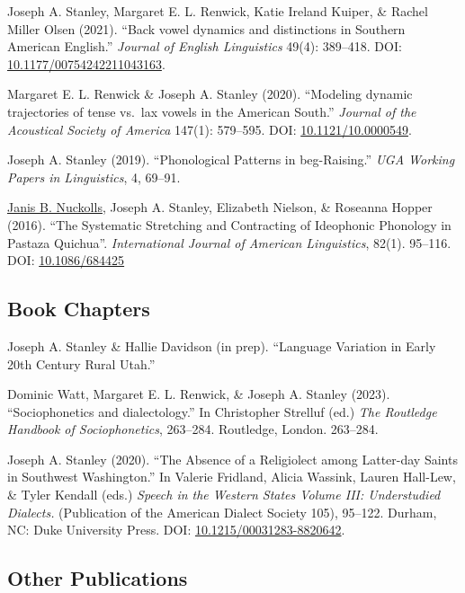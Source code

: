 \documentclass[
]{article}
\begin{document}
{Joseph A. Stanley}, Margaret E. L. Renwick, Katie Ireland Kuiper, \&
Rachel Miller Olsen (2021). ``Back vowel dynamics and distinctions in
Southern American English.'' \emph{Journal of English Linguistics}
49(4): 389--418. DOI:
\href{https://doi.org/10.1177/00754242211043163}{10.1177/00754242211043163}.

Margaret E. L. Renwick \& {Joseph A. Stanley} (2020). ``Modeling dynamic
trajectories of tense vs.~lax vowels in the American South.''
\emph{Journal of the Acoustical Society of America} 147(1): 579--595.
DOI:
\href{https://asa.scitation.org/doi/10.1121/10.0000549}{10.1121/10.0000549}.

{Joseph A. Stanley} (2019). ``Phonological Patterns in beg-Raising.''
\emph{UGA Working Papers in Linguistics}, 4, 69--91.

\href{https://hum.byu.edu/directory/janis-nuckolls}{Janis B. Nuckolls},
{Joseph A. Stanley}, Elizabeth Nielson, \& Roseanna Hopper (2016). ``The
Systematic Stretching and Contracting of Ideophonic Phonology in Pastaza
Quichua''. \emph{International Journal of American Linguistics}, 82(1).
95--116. DOI: \href{http://dx.doi.org/10.1086/684425}{10.1086/684425}

\hypertarget{book-chapters}{%
\subsection{Book Chapters}\label{book-chapters}}

{Joseph A. Stanley} \& Hallie Davidson (in prep). ``Language Variation
in Early 20th Century Rural Utah.''

Dominic Watt, Margaret E. L. Renwick, \& {Joseph A. Stanley} (2023).
``Sociophonetics and dialectology.'' In Christopher Strelluf (ed.)
\emph{The Routledge Handbook of Sociophonetics}, 263--284. Routledge,
London. 263--284.

{Joseph A. Stanley} (2020). ``The Absence of a Religiolect among
Latter-day Saints in Southwest Washington.'' In Valerie Fridland, Alicia
Wassink, Lauren Hall-Lew, \& Tyler Kendall (eds.) \emph{Speech in the
Western States Volume III: Understudied Dialects.} (Publication of the
American Dialect Society 105), 95--122. Durham, NC: Duke University
Press. DOI:
\href{https://doi.org/10.1215/00031283-8820642}{10.1215/00031283-8820642}.

\hypertarget{other-publications}{%
\subsection{Other Publications}\label{other-publications}}
\end{document}
